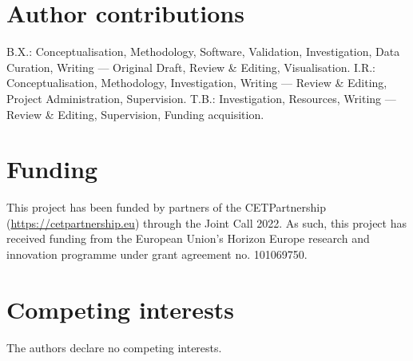 \documentclass[pdflatex,sn-nature]{sn-jnl}%
\theoremstyle{thmstyleone}%
\theoremstyle{thmstyletwo}%
\theoremstyle{thmstylethree}%
\begin{document}
\section*{Author contributions}
B.X.: Conceptualisation, Methodology, Software, Validation, Investigation, Data Curation, Writing --- Original Draft, Review \& Editing, Visualisation. I.R.: Conceptualisation, Methodology, Investigation, Writing --- Review \& Editing, Project Administration, Supervision. T.B.: Investigation, Resources, Writing --- Review \& Editing, Supervision, Funding acquisition.

\section*{Funding}
This project has been funded by partners of the CETPartnership (\href{https://cetpartnership.eu}{https://cetpartnership.eu}) through the Joint Call 2022. As such, this project has received funding from the European Union's Horizon Europe research and innovation programme under grant agreement no. 101069750.

\section*{Competing interests}
The authors declare no competing interests.
\end{document}
